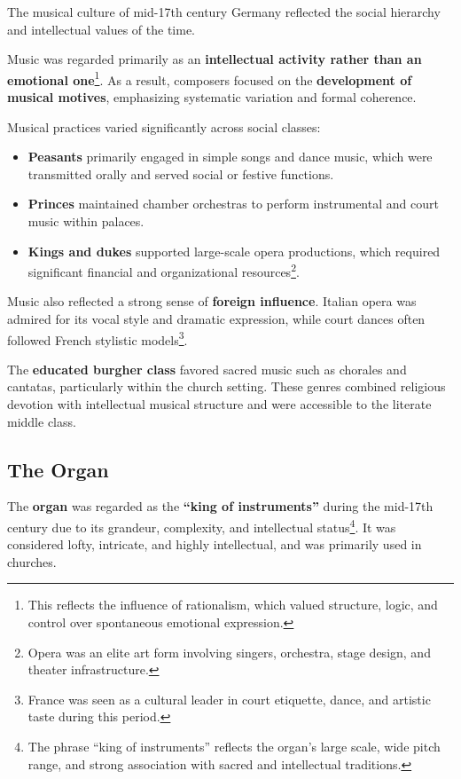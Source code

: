 \documentclass[math,code]{amznotes}
\theoremstyle{remark}
\begin{document}
The musical culture of mid-17th century Germany reflected the social hierarchy and intellectual values of the time.

Music was regarded primarily as an \textbf{intellectual activity rather than an emotional one}\footnote{This reflects the influence of rationalism, which valued structure, logic, and control over spontaneous emotional expression.}. As a result, composers focused on the \textbf{development of musical motives}, emphasizing systematic variation and formal coherence.

Musical practices varied significantly across social classes:
\begin{itemize}
    \item \textbf{Peasants} primarily engaged in simple songs and dance music, which were transmitted orally and served social or festive functions.
    \item \textbf{Princes} maintained chamber orchestras to perform instrumental and court music within palaces.
    \item \textbf{Kings and dukes} supported large-scale opera productions, which required significant financial and organizational resources\footnote{Opera was an elite art form involving singers, orchestra, stage design, and theater infrastructure.}.
\end{itemize}

Music also reflected a strong sense of \textbf{foreign influence}. Italian opera was admired for its vocal style and dramatic expression, while court dances often followed French stylistic models\footnote{France was seen as a cultural leader in court etiquette, dance, and artistic taste during this period.}.

The \textbf{educated burgher class} favored sacred music such as chorales and cantatas, particularly within the church setting. These genres combined religious devotion with intellectual musical structure and were accessible to the literate middle class.

\subsection{The Organ}

The \textbf{organ} was regarded as the \textbf{``king of instruments''} during the mid-17th century due to its grandeur, complexity, and intellectual status\footnote{The phrase “king of instruments” reflects the organ's large scale, wide pitch range, and strong association with sacred and intellectual traditions.}.  It was considered lofty, intricate, and highly intellectual, and was primarily used in churches.
\end{document}
